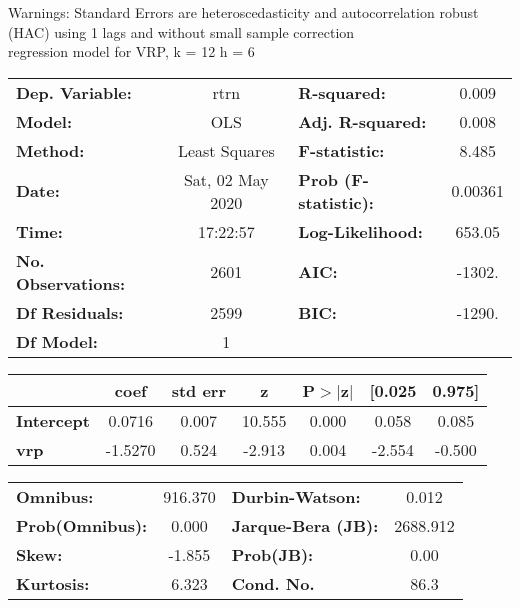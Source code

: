 Warnings: \newline
 [1] Standard Errors are heteroscedasticity and autocorrelation robust (HAC) using 1 lags and without small sample correction\\ 

regression model for VRP, k = 12 h = 6\begin{center}
\begin{tabular}{lclc}
\toprule
\textbf{Dep. Variable:}    &       rtrn       & \textbf{  R-squared:         } &     0.009   \\
\textbf{Model:}            &       OLS        & \textbf{  Adj. R-squared:    } &     0.008   \\
\textbf{Method:}           &  Least Squares   & \textbf{  F-statistic:       } &     8.485   \\
\textbf{Date:}             & Sat, 02 May 2020 & \textbf{  Prob (F-statistic):} &  0.00361    \\
\textbf{Time:}             &     17:22:57     & \textbf{  Log-Likelihood:    } &    653.05   \\
\textbf{No. Observations:} &        2601      & \textbf{  AIC:               } &    -1302.   \\
\textbf{Df Residuals:}     &        2599      & \textbf{  BIC:               } &    -1290.   \\
\textbf{Df Model:}         &           1      & \textbf{                     } &             \\
\bottomrule
\end{tabular}
\begin{tabular}{lcccccc}
                   & \textbf{coef} & \textbf{std err} & \textbf{z} & \textbf{P$> |$z$|$} & \textbf{[0.025} & \textbf{0.975]}  \\
\midrule
\textbf{Intercept} &       0.0716  &        0.007     &    10.555  &         0.000        &        0.058    &        0.085     \\
\textbf{vrp}       &      -1.5270  &        0.524     &    -2.913  &         0.004        &       -2.554    &       -0.500     \\
\bottomrule
\end{tabular}
\begin{tabular}{lclc}
\textbf{Omnibus:}       & 916.370 & \textbf{  Durbin-Watson:     } &    0.012  \\
\textbf{Prob(Omnibus):} &   0.000 & \textbf{  Jarque-Bera (JB):  } & 2688.912  \\
\textbf{Skew:}          &  -1.855 & \textbf{  Prob(JB):          } &     0.00  \\
\textbf{Kurtosis:}      &   6.323 & \textbf{  Cond. No.          } &     86.3  \\
\bottomrule
\end{tabular}
\end{center}

